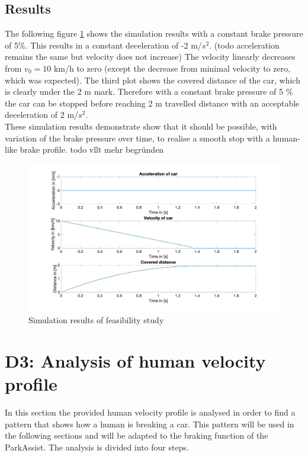 \section{Results}\label{sec:D2_results}
The following figure \ref{fig:D2_Result} shows the simulation results with a constant brake pressure of 5\%. This results in a constant deceleration of -2 m/$s^2$. (todo acceleration remains the same but velocity does not increase)
The velocity linearly decreases from $v_0 = 10$ km/h to zero (except the decrease from minimal velocity to zero, which was expected).
The third plot shows the covered distance of the car, which is clearly under the 2 m mark.
Therefore with a constant brake pressure of 5 \% the car can be stopped before reaching 2 m travelled distance with an acceptable deceleration of 2 m/$s^2$.\\
These simulation results demonstrate show that it should be possible, with variation of the brake pressure over time, to realise a smooth stop with a human-like brake profile.
todo vllt mehr begründen
\begin{figure}[H]
\centering
\includegraphics[width=1\textwidth]{images/D2_plot.jpg}
\caption{Simulation results of feasibility study}
\label{fig:D2_Result}
\end{figure}

\chapter{D3: Analysis of human velocity profile}\label{cha:D3}

In this section the provided human velocity profile is analysed in order to find a pattern that shows how a human is breaking a car. This pattern will be used in the following sections and will be adapted to the braking function of the ParkAssist. The analysis is divided into four steps.

